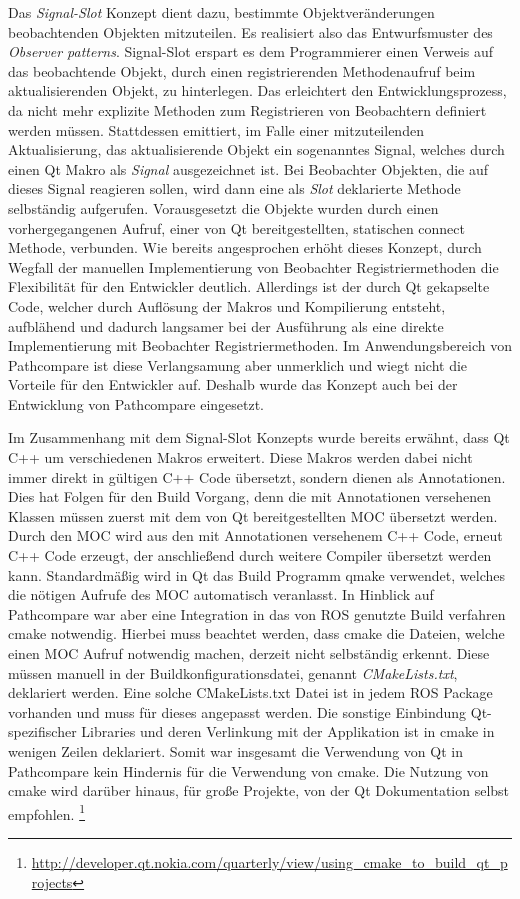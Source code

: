 Das \textit{Signal-Slot} Konzept dient dazu, bestimmte Objektveränderungen
beobachtenden Objekten mitzuteilen.  Es realisiert also das Entwurfsmuster des
\textit{Observer patterns}. Signal-Slot erspart es dem Programmierer
einen Verweis auf das beobachtende Objekt, durch einen registrierenden
Methodenaufruf beim aktualisierenden Objekt, zu hinterlegen.  Das erleichtert
den Entwicklungsprozess, da nicht mehr explizite Methoden zum Registrieren von
Beobachtern definiert werden müssen. Stattdessen emittiert, im Falle einer
mitzuteilenden Aktualisierung, das aktualisierende Objekt ein sogenanntes
Signal, welches durch einen Qt Makro als \textit{Signal} ausgezeichnet ist. Bei
Beobachter Objekten, die auf dieses Signal reagieren sollen, wird dann eine als
\textit{Slot} deklarierte Methode selbständig aufgerufen. Vorausgesetzt die
Objekte wurden durch einen vorhergegangenen Aufruf, einer von Qt
bereitgestellten, statischen connect Methode, verbunden. Wie bereits
angesprochen erhöht dieses Konzept, durch Wegfall der manuellen Implementierung
von Beobachter Registriermethoden die Flexibilität für den Entwickler deutlich.
Allerdings ist der durch Qt gekapselte Code, welcher durch Auflösung der Makros
und Kompilierung entsteht, aufblähend und dadurch langsamer bei der Ausführung
als eine direkte Implementierung mit Beobachter Registriermethoden. Im
Anwendungsbereich von Pathcompare ist diese Verlangsamung aber unmerklich und
wiegt nicht die Vorteile für den Entwickler auf. Deshalb wurde das Konzept auch
bei der Entwicklung von Pathcompare eingesetzt. 

Im Zusammenhang mit dem Signal-Slot Konzepts wurde bereits erwähnt, dass Qt C++
um verschiedenen Makros erweitert. Diese Makros werden dabei nicht immer direkt
in gültigen C++ Code übersetzt, sondern dienen als Annotationen. Dies hat
Folgen für den Build Vorgang, denn die mit Annotationen versehenen Klassen
müssen zuerst mit dem von Qt bereitgestellten \gls{MOC} übersetzt werden.
Durch den MOC wird aus den mit Annotationen versehenem C++ Code, erneut C++
Code erzeugt, der anschließend durch weitere Compiler übersetzt werden kann.
Standardmäßig wird in Qt das Build Programm qmake verwendet, welches
die nötigen Aufrufe des MOC automatisch veranlasst. In Hinblick auf
Pathcompare war aber eine Integration in das von ROS genutzte Build
verfahren cmake notwendig. Hierbei muss beachtet werden, dass cmake die
Dateien, welche einen MOC Aufruf notwendig machen, derzeit nicht
selbständig erkennt. Diese müssen manuell in der Buildkonfigurationsdatei,
genannt \textit{CMakeLists.txt}, deklariert werden.  Eine solche CMakeLists.txt
Datei ist in jedem ROS Package vorhanden und muss für dieses angepasst werden.
Die sonstige Einbindung Qt-spezifischer Libraries und deren Verlinkung
mit der Applikation ist in cmake in wenigen Zeilen deklariert. Somit war
insgesamt die Verwendung von Qt in Pathcompare kein Hindernis für die
Verwendung von cmake. Die Nutzung von cmake wird darüber hinaus, für große
Projekte, von der Qt Dokumentation selbst empfohlen.
\footnote{\url{http://developer.qt.nokia.com/quarterly/view/using_cmake_to_build_qt_projects}}

